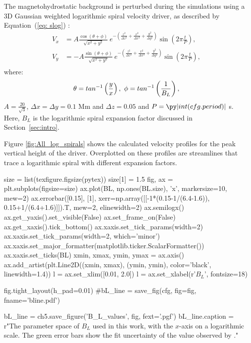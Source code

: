 The magnetohydrostatic background is perturbed during the simulations using a 3D Gaussian weighted logarithmic spiral velocity driver, as described by Equation~(\ref{eq: slog}) \citep{Mumford2015}:
\begin{subequations}
    \begin{align}
    V_x &= A \frac{\cos(\theta + \phi)}{\sqrt{x^2 + y^2}}\ e^{-\left(\frac{z^2}{\Delta z^2} + \frac{x^2}{\Delta x^2} + \frac{y^2}{\Delta y^2}\right)} \sin \left(2\pi \frac{t}{P}\right),\\
    V_y &= - A \frac{\sin(\theta + \phi)}{\sqrt{x^2 + y^2}}\ e^{-\left(\frac{z^2}{\Delta z^2} + \frac{x^2}{\Delta x^2} + \frac{y^2}{\Delta y^2}\right)} \sin \left(2\pi \frac{t}{P}\right),\label{eq:Slog}\\
    \end{align}
    \label{eq: slog}
\end{subequations}
where:
\begin{equation*}
\theta = tan^{-1}\left(\frac{y}{x}\right),\ \phi = tan^{-1}\left(\frac{1}{B_L}\right),\notag	
\end{equation*}
$A=\frac{20}{\sqrt{3}}$, $\Delta x = \Delta y = 0.1$ Mm and $\Delta z = 0.05$ and $P=\py|int(cfg.period)|$ s.
Here, $B_L$ is the logarithmic spiral expansion factor discussed in Section~\ref{sec:intro}.

Figure \ref{fig:All_log_spirals} shows the calculated velocity profiles for the peak vertical height of the driver.
Overplotted on these profiles are streamlines that trace a logarithmic spiral with different expansion factors.

\begin{pycode}[chapter5]
size = list(texfigure.figsize(pytex))
size[1] = 1.5
fig, ax = plt.subplots(figsize=size)
ax.plot(BL, np.ones(BL.size), 'x', markersize=10, mew=2)
ax.errorbar([0.15], [1], xerr=np.array([[-1*(0.15-1/(6.4-1.6)), 0.15+1/(6.4+1.6)]]).T, mew=2, elinewidth=2)
ax.semilogx()
ax.get_yaxis().set_visible(False)
ax.set_frame_on(False)
ax.get_xaxis().tick_bottom()
ax.xaxis.set_tick_params(width=2)
ax.xaxis.set_tick_params(width=2, which='minor')
ax.xaxis.set_major_formatter(matplotlib.ticker.ScalarFormatter())
ax.xaxis.set_ticks(BL)
xmin, xmax, ymin, ymax = ax.axis()
ax.add_artist(plt.Line2D((xmin, xmax), (ymin, ymin), color='black', linewidth=1.4))
l = ax.set_xlim([0.01, 2.0])
l = ax.set_xlabel(r'$B_L$', fontsize=18)

fig.tight_layout(h_pad=0.01)
#bL_line = save_fig(cfg, fig=fig, fname='bline.pdf')

bL_line = ch5.save_figure('B_L_values', fig, fext='.pgf')
bL_line.caption = r"The parameter space of $B_L$ used in this work, with the $x$-axis on a logarithmic scale. The green error bars show the fit uncertainty of the value observed by \citet{Bonet2008}."
\end{pycode}

